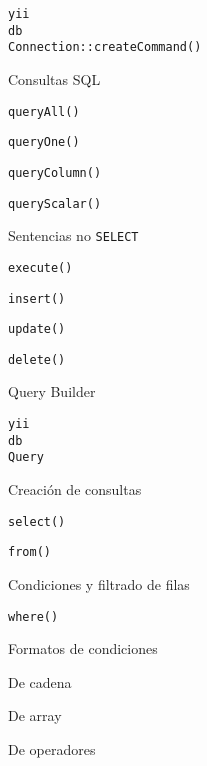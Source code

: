\begin{longenum}
\begin{longenum}
\begin{longenum}
            \item \texttt{yii\\db\\Connection::createCommand()}
            \item Consultas SQL
            \begin{longenum}
                \item \texttt{queryAll()}
                \item \texttt{queryOne()}
                \item \texttt{queryColumn()}
                \item \texttt{queryScalar()}
            \end{longenum}
            \item Sentencias no \texttt{SELECT}
            \begin{longenum}
                \item \texttt{execute()}
                \item \texttt{insert()}
                \item \texttt{update()}
                \item \texttt{delete()}
            \end{longenum}
        \end{longenum}
        \item Query Builder
        \begin{longenum}
            \item \texttt{yii\\db\\Query}
            \item Creación de consultas
            \begin{longenum}
                \item \texttt{select()}
                \item \texttt{from()}
                \item Condiciones y filtrado de filas
                \begin{longenum}
                    \item \texttt{where()}
                    \item Formatos de condiciones
                    \begin{longenum}
                        \item De cadena
                        \item De array
                        \item De operadores
                    \end{longenum}

\end{longenum}
\end{longenum}
\end{longenum}
\end{longenum}
\end{longenum}
